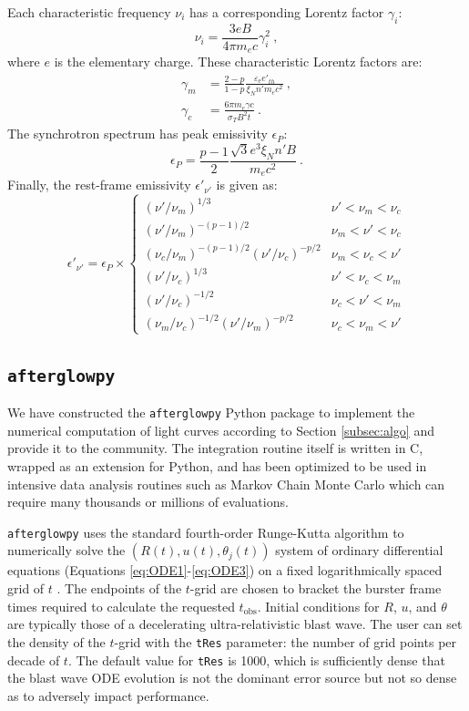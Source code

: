 \documentclass[twocolumn]{aastex62}
\newcommand{\afterglowpy}{{\tt afterglowpy}}
\newcommand{\tobs}{\ensuremath{t_{\mathrm{obs}}}}
\newcommand{\epse}{\ensuremath{\varepsilon_{\mathrm{e}}}}
\newcommand{\xiN}{\ensuremath{\xi_N}}
\begin{document}
Each characteristic frequency $\nu_i$ has a corresponding Lorentz factor $\gamma_i$:
\begin{equation}
	\nu_i = \frac{3e B}{4 \pi m_e c}  \gamma_i^2 \ ,
\end{equation}
where $e$ is the elementary charge.  These characteristic Lorentz factors are:
\begin{align}
	\gamma_m &= \frac{2-p}{1-p} \frac{\epse e'_{th}}{\xiN n' m_e c^2}\ , \\
	\gamma_c &= \frac{6\pi m_e \gamma c}{\sigma_T B^2 t}\ .
\end{align}
The synchrotron spectrum has peak emissivity $\epsilon_P$:
\begin{equation}
	\epsilon_P = \frac{p-1}{2}\frac{\sqrt{3} e^3 \xiN n' B}{m_e c^2}\ .
\end{equation}
Finally, the rest-frame emissivity $\epsilon'_{\nu'}$ is given as:
\begin{equation}
	\epsilon'_{\nu'} = \epsilon_P \times \begin{cases}
					(\nu' / \nu_m)^{1/3} & \nu' < \nu_m < \nu_c \\
					(\nu' / \nu_m)^{-(p-1)/2} & \nu_m < \nu' < \nu_c \\
					(\nu_c / \nu_m)^{-(p-1)/2}(\nu' / \nu_c)^{-p/2} & \nu_m < \nu_c < \nu' \\
					(\nu' / \nu_c)^{1/3} & \nu' < \nu_c < \nu_m \\
					(\nu' / \nu_c)^{-1/2} & \nu_c < \nu' < \nu_m \\
					(\nu_m / \nu_c)^{-1/2}(\nu' / \nu_m)^{-p/2} & \nu_c < \nu_m < \nu'
				\end{cases} \label{eq:syncSpec}
\end{equation}


\subsection{\afterglowpy{}} \label{subsec:afterglowpy}


We have constructed the \afterglowpy{} Python package to implement the numerical computation of light curves according to Section \ref{subsec:algo} and provide it to the community.  The integration routine itself is written in C, wrapped as an extension for Python, and has been optimized to be used in intensive data analysis routines such as Markov Chain Monte Carlo which can require many thousands or millions of evaluations.  

\afterglowpy{} uses the standard fourth-order Runge-Kutta algorithm to numerically solve the $(R(t), u(t), \theta_j(t))$ system of ordinary differential equations (Equations \eqref{eq:ODE1}-\eqref{eq:ODE3}) on a fixed logarithmically spaced grid of $t$ \citep{Press:2007aa}.  The endpoints of the $t$-grid are chosen to bracket the burster frame times required to calculate the requested $\tobs$.  Initial conditions for $R$, $u$, and $\theta$ are typically those of a decelerating ultra-relativistic blast wave.  The user can set the density of the $t$-grid with the {\tt tRes} parameter: the number of grid points per decade of $t$.  The default value for {\tt tRes} is 1000, which is sufficiently dense that the blast wave ODE evolution is not the dominant error source but not so dense as to adversely impact performance.
\end{document}
